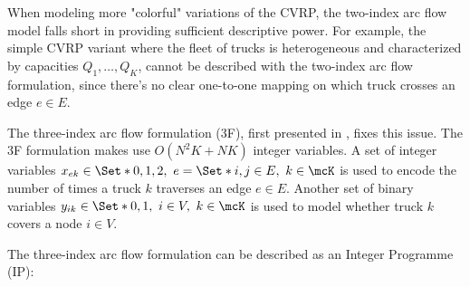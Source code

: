 When modeling more "colorful" variations of the CVRP,
the two-index arc flow model falls short in providing sufficient descriptive power.
For example,
the simple CVRP variant where the fleet of trucks is heterogeneous
and characterized by capacities $Q_1, \dots, Q_K$,
cannot be described with the two-index arc flow formulation,
since there's no clear one-to-one mapping on which truck crosses an edge $e \in E$.

The three-index arc flow formulation (3F),
first presented in \textcite{golden1977},
fixes this issue.
The 3F formulation makes use $O(N^2 K + N K)$ integer variables.
A set of integer variables $x_{ek} \in \Set*{0, 1, 2},\ e = \Set*{i, j} \in E,\ k \in \mcK$
is used to encode the number of times a truck $k$ traverses an edge $e \in E$.
Another set of binary variables $y_{ik} \in \Set*{0, 1},\ i \in V,\ k \in \mcK$
is used to model whether truck $k$ covers a node $i \in V$.


The three-index arc flow formulation can be described as an Integer Programme (IP):


